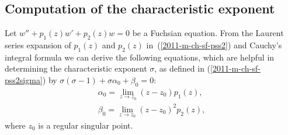 \subsection{Computation of the characteristic exponent}

 Let
 $w'' +p_1(z)w' +p_2(z)w=0$
be a Fuchsian equation.
From the Laurent series expansion of $p_1(z)$ and $p_2(z)$ in~(\ref{2011-m-ch-sf-pss2}) and Cauchy's integral formula  we can derive
the following equations, which are helpful in determining the characteristic exponent $\sigma$,
as defined in (\ref{2011-m-ch-sf-pss2sigma}) by
$
\sigma({\sigma-1}) +  \sigma \alpha_{0} + \beta_{0}           =   0
$:
\begin{equation}
\begin{split}
\alpha_0=\lim_{z\rightarrow z_0} (z-z_0)p_1(z),\\
\beta_0=\lim_{z\rightarrow z_0} (z-z_0)^2p_2(z),
\end{split}
\end{equation}
 where $z_0$ is a regular singular point.


